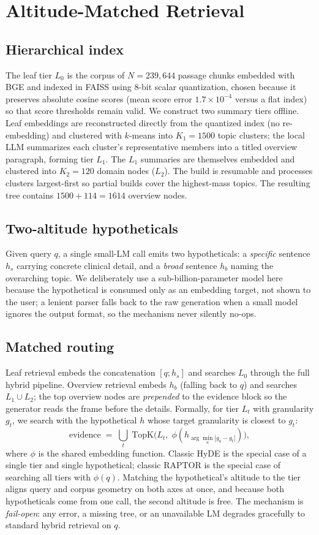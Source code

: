 \documentclass[conference]{IEEEtran}
\begin{document}
\section{Altitude-Matched Retrieval}\label{sec:altitude}
\subsection{Hierarchical index}
The leaf tier $L_0$ is the corpus of $N{=}239{,}644$ passage chunks embedded
with BGE and indexed in FAISS using 8-bit scalar quantization, chosen because it
preserves absolute cosine scores (mean score error $1.7\times10^{-4}$ versus a
flat index) so that score thresholds remain valid. We construct two summary
tiers offline. Leaf embeddings are reconstructed directly from the quantized
index (no re-embedding) and clustered with $k$-means into $K_1{=}1500$ topic
clusters; the local LLM summarizes each cluster's representative members into a
titled overview paragraph, forming tier $L_1$. The $L_1$ summaries are themselves
embedded and clustered into $K_2{=}120$ domain nodes ($L_2$). The build is
resumable and processes clusters largest-first so partial builds cover the
highest-mass topics. The resulting tree contains $1500{+}114{=}1614$ overview
nodes.

\subsection{Two-altitude hypotheticals}
Given query $q$, a single small-LM call emits two hypotheticals: a
\emph{specific} sentence $h_s$ carrying concrete clinical detail, and a
\emph{broad} sentence $h_b$ naming the overarching topic. We deliberately use a
sub-billion-parameter model here because the hypothetical is consumed only as an
embedding target, not shown to the user; a lenient parser falls back to the raw
generation when a small model ignores the output format, so the mechanism never
silently no-ops.

\subsection{Matched routing}
Leaf retrieval embeds the concatenation $[q ; h_s]$ and searches $L_0$ through
the full hybrid pipeline. Overview retrieval embeds $h_b$ (falling back to $q$)
and searches $L_1{\cup}L_2$; the top overview nodes are \emph{prepended} to the
evidence block so the generator reads the frame before the details. Formally, for
tier $L_t$ with granularity $g_t$, we search with the hypothetical $h$ whose
target granularity is closest to $g_t$:
\[
\text{evidence} \;=\; \bigcup_{t}\; \text{TopK}\big(L_t,\; \phi(h_{\arg\min_a |g_a-g_t|})\big),
\]
where $\phi$ is the shared embedding function. Classic HyDE is the special case
of a single tier and single hypothetical; classic RAPTOR is the special case of
searching all tiers with $\phi(q)$. Matching the hypothetical's altitude to the
tier aligns query and corpus geometry on both axes at once, and because both
hypotheticals come from one call, the second altitude is free. The mechanism is
\emph{fail-open}: any error, a missing tree, or an unavailable LM degrades
gracefully to standard hybrid retrieval on $q$.
\end{document}
